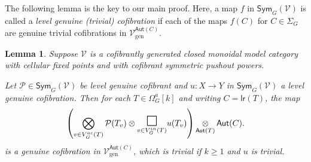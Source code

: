 \documentclass[a4paper,10pt
,draft
]{article}%
\numberwithin{equation}{section}
\numberwithin{figure}{section}
\newtheorem{lemma}[equation]{Lemma}%
\theoremstyle{definition} %
\newcommand{\Sym}{\ensuremath{\mathsf{Sym}}}%
\newcommand{\V}{\ensuremath{\mathcal V}}
\renewcommand{\P}{\ensuremath{\mathcal P}}
\newcommand{\1}{\ensuremath{\mathbbm 1}}%
\begin{document}
The following lemma is the key to our main proof. 
Here, a map $f$ in 
$\mathsf{Sym}_G(\mathcal{V})$ is called
a \textit{level genuine (trivial) cofibration} if each of the maps
$f(C)$ for $C \in \Sigma_G$ are genuine trivial cofibrations in
$\mathcal{V}^{\mathsf{Aut}(C)}_{\text{gen}}$.

\begin{lemma}\label{EXMAINLEM LEM}
	Suppose $\mathcal{V}$ is a cofibrantly generated closed monoidal model category
	with cellular fixed points and
	with cofibrant symmetric pushout powers.
	
	Let $\mathcal{P} \in \mathsf{Sym}_G(\mathcal{V})$
	be level genuine cofibrant
	and  
	$u: X \to Y$ in $\Sym_G(\V)$ a level genuine cofibration. 
	Then for each $T \in \Omega^a_G[k]$ and writing
	$C = \mathsf{lr}(T)$, the map	
\begin{equation}\label{EXMAINLEM EQ}
	\left(
		\bigotimes\limits_{v \in V_{G}^{ac}(T)}\P(T_v) \otimes
		\underset{v \in V_{G}^{in}(T)}
	{\mathlarger{\mathlarger{\mathlarger{\square}}}}
		u(T_v)
	\right) 
	\mathop{\otimes}\limits_{\mathsf{Aut}(T)} \mathsf{Aut}(C).
\end{equation}
	is a genuine cofibration in 
	$\mathcal{V}^{\mathsf{Aut}(C)}_{\text{gen}}$,
	which is trivial if $k \geq 1$ and $u$ is trivial.	
\end{lemma}
\end{document}
